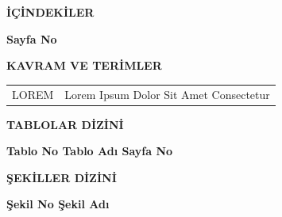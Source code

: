 \documentclass[12pt]{report}
\begin{document}
{\centering\normalsize\bfseries İÇİNDEKİLER\par}

\vspace{\baselineskip}

{\noindent\hfill\normalsize\bfseries Sayfa No\par}
\tableofcontents


\newpage
{}
\centerline{\normalsize\bfseries KAVRAM VE TERİMLER}

\vspace{\baselineskip}

\noindent
\begin{tabular}{p{4cm} p{10cm}}
LOREM & Lorem Ipsum Dolor Sit Amet Consectetur \\
\end{tabular}


\newpage
{}
\centerline{\normalsize\bfseries TABLOLAR DİZİNİ}

\vspace{\baselineskip}

{\noindent \normalsize\bfseries Tablo No \quad Tablo Adı \hfill Sayfa No\par}

\setlength{\cftbeforetabskip}{0pt}
\setlength{\cftbeforelottitleskip}{0.8cm}
\setlength{\cftafterlottitleskip}{0pt}

\begingroup
{}
\listoftables
\endgroup

\newpage
{}
\centerline{\normalsize\bfseries ŞEKİLLER DİZİNİ}

\vspace{\baselineskip}

{\noindent\normalsize\bfseries Şekil No \quad Şekil Adı \hfill {}\par}


\setlength{\cftbeforefigskip}{0pt}
\setlength{\cftbeforeloftitleskip}{0.8cm}
\setlength{\cftafterloftitleskip}{0pt}

\begingroup
{}
\raggedright
\listoffigures
\endgroup
\end{document}
